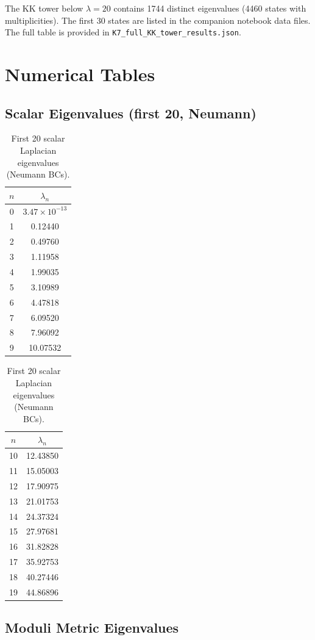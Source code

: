 \documentclass[11pt,a4paper]{article}
\theoremstyle{remark}
\begin{document}
The KK tower below $\lambda = 20$ contains 1744 distinct eigenvalues (4460 states with
multiplicities). The first 30 states are listed in the companion notebook data files.
The full table is provided in \texttt{K7\_full\_KK\_tower\_\allowbreak results.json}.

\section{Numerical Tables}

\subsection{Scalar Eigenvalues (first 20, Neumann)}

\begin{table}[htbp]
\centering
\begin{tabular}{cc}
\toprule
$n$ & $\lambda_n$ \\
\midrule
0 & $3.47 \times 10^{-13}$ \\
1 & 0.12440 \\
2 & 0.49760 \\
3 & 1.11958 \\
4 & 1.99035 \\
5 & 3.10989 \\
6 & 4.47818 \\
7 & 6.09520 \\
8 & 7.96092 \\
9 & 10.07532 \\
\bottomrule
\end{tabular}
\quad
\begin{tabular}{cc}
\toprule
$n$ & $\lambda_n$ \\
\midrule
10 & 12.43850 \\
11 & 15.05003 \\
12 & 17.90975 \\
13 & 21.01753 \\
14 & 24.37324 \\
15 & 27.97681 \\
16 & 31.82828 \\
17 & 35.92753 \\
18 & 40.27446 \\
19 & 44.86896 \\
\bottomrule
\end{tabular}
\caption{First 20 scalar Laplacian eigenvalues (Neumann BCs).}
\label{tab:eigenvalues}
\end{table}

\subsection{Moduli Metric Eigenvalues}
\end{document}
